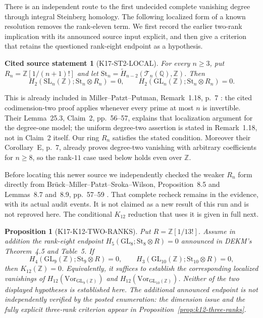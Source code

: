 \documentclass[11pt,a4paper]{article}
\newtheorem{proposition}[theorem]{Proposition}
\newtheorem{sourcefact}[theorem]{Cited source statement}
\theoremstyle{definition}
\begin{document}
There is an independent route to the first undecided complete vanishing
degree through integral Steinberg homology. The following localized
form of a known resolution removes the rank-eleven term. We first
record the earlier two-rank implication with its announced source
input explicit, and then give a criterion that retains the questioned
rank-eight endpoint as a hypothesis.

\begin{sourcefact}[K17-ST2-LOCAL]\label{prop:steinberg-two-local}
For every $n\ge3$, put $R_n=\mathbb Z[1/(n+1)!]$ and let
$\mathrm{St}_n=\widetilde H_{n-2}(\mathcal T_n(\mathbb Q),\mathbb Z)$.
Then
\[
 H_2(\mathrm{SL}_n(\mathbb Z);\mathrm{St}_n\otimes R_n)=0,
 \qquad
 H_2(\mathrm{GL}_n(\mathbb Z);\mathrm{St}_n\otimes R_n)=0.
\]
\end{sourcefact}

This is already included in Miller--Patzt--Putman,
Remark~1.18, p.~7 \cite{MillerPatztPutman2025}: the cited
codimension-two proof applies whenever every prime at most $n$
is invertible. Their Lemma~25.3, Claim~2, pp.~56--57, explains
that localization argument for the degree-one model; the
uniform degree-two assertion is stated in Remark~1.18, not in
Claim~2 itself. Our ring $R_n$ satisfies the stated condition.
Moreover their Corollary~E, p.~7, already proves degree-two
vanishing with arbitrary coefficients for $n\ge8$, so the
rank-$11$ case used below holds even over $\mathbb Z$.

Before locating this newer source we independently checked the
weaker $R_n$ form directly from Br\"uck--Miller--Patzt--Sroka--Wilson,
Proposition~8.5 and Lemmas~8.7 and~8.9, pp.~57--59
\cite{BrueckEtAl2024}. That complete recheck remains in the
evidence, with its actual audit events. It is not claimed as a
new result of this run and is not reproved here. The conditional
$K_{12}$ reduction that uses it is given in full next.

\begin{proposition}[K17-K12-TWO-RANKS]\label{prop:k12-two-ranks}
Put $R=\mathbb Z[1/13!]$. Assume in addition the rank-eight endpoint
$H_5(\mathrm{GL}_8;\mathrm{St}_8\otimes R)=0$
announced in DEKM's Theorem~4.5 and Table~5. If
\[
 H_4(\mathrm{GL}_9(\mathbb Z);\mathrm{St}_9\otimes R)=0,
 \qquad
 H_3(\mathrm{GL}_{10}(\mathbb Z);\mathrm{St}_{10}\otimes R)=0,
                                                               \tag{K23}
\]
then $K_{12}(\mathbb Z)=0$.
Equivalently, it suffices to establish the corresponding localized
vanishings of $H_{12}(\mathrm{Vor}_{\mathrm{GL}_9(\mathbb Z)})$
and $H_{12}(\mathrm{Vor}_{\mathrm{GL}_{10}(\mathbb Z)})$.
Neither of the two displayed hypotheses is established here.
The additional announced endpoint is not independently verified by
the posted enumeration: the dimension issue and the fully explicit
three-rank criterion appear in Proposition~\ref{prop:k12-three-ranks}.
\end{proposition}
\end{document}
